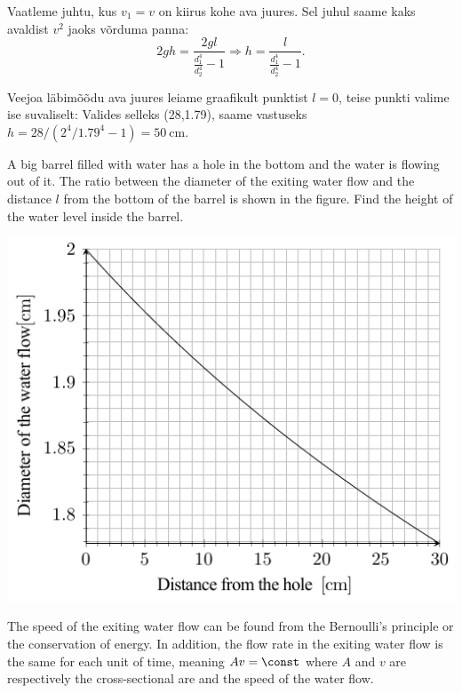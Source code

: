 Vaatleme juhtu, kus $v_1=v$ on kiirus kohe ava juures. Sel juhul saame kaks avaldist $v^2$ jaoks võrduma panna:
$$2gh=\frac{2gl}{\frac{d_1^4}{d_2^4}-1}\Rightarrow h=\frac{l}{\frac{d_1^4}{d_2^4}-1}.$$

Veejoa läbimõõdu ava juures leiame graafikult punktist $l=0$, teise punkti valime ise suvaliselt: Valides selleks (28,\num{1.79}), saame vastuseks $h=28/(2^4/\num{1.79}^4-1)=\SI{50}{\cm}$.

A big barrel filled with water has a hole in the bottom and the water is flowing out of it. The ratio between the diameter of the exiting water flow and the distance $l$ from the bottom of the barrel is shown in the figure. Find the height of the water level inside the barrel.
\begin{center}
\includegraphics[width = 0.6\linewidth]{2018-v3g-02-juga_ing}
\end{center}

\hinteng
The speed of the exiting water flow can be found from the Bernoulli’s principle or the conservation of energy. In addition, the flow rate in the exiting water flow is the same for each unit of time, meaning $Av = \const$ where $A$ and $v$ are respectively the cross-sectional are and the speed of the water flow.

